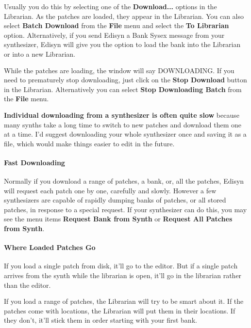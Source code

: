 \documentclass{article}
\begin{document}
Usually you do this by selecting one of the {\bf Download...} options in the Librarian.  As the patches are loaded, they appear in the Librarian.  You can also select {\bf Batch Download} from the {\bf File} menu and select the {\bf To Librarian} option.  Alternatively, if you send Edisyn a Bank Sysex message from your synthesizer, Edisyn will give you the option to load the bank into the Librarian or into a new Librarian. 

While the patches are loading, the window will say {DOWNLOADING}.  If you need to prematurely stop downloading, just click on the {\bf Stop Download} button in the Librarian.  Alternatively you can select {\bf Stop Downloading Batch} from the {\bf File} menu.

{\color{red}\bf Individual downloading from a synthesizer is often quite slow} because many synths take a long time to switch to new patches and download them one at a time.  I'd suggest downloading your whole synthesizer once and saving it as a file, which would make things easier to edit in the future.

\paragraph{Fast Downloading}

Normally if you download a range of patches, a bank, or, all the patches, Edisyn will request each patch one by one, carefully and slowly.  However a few synthesizers are capable of rapidly dumping banks of patches, or all stored patches, in response to a special request.  If your synthesizer can do this, you may see the menu items {\bf Request Bank from Synth} or {\bf Request All Patches from Synth}.


\paragraph{Where Loaded Patches Go}

If you load a single patch from disk, it'll go to the editor.  But if a single patch arrives from the synth while the librarian is open, it'll go in the librarian rather than the editor.  %

If you load a range of patches, the Librarian will try to be smart about it.  If the patches come with locations, the Librarian will put them in their locations.  If they don't, it'll stick them in order starting with your first bank.  
\end{document}
